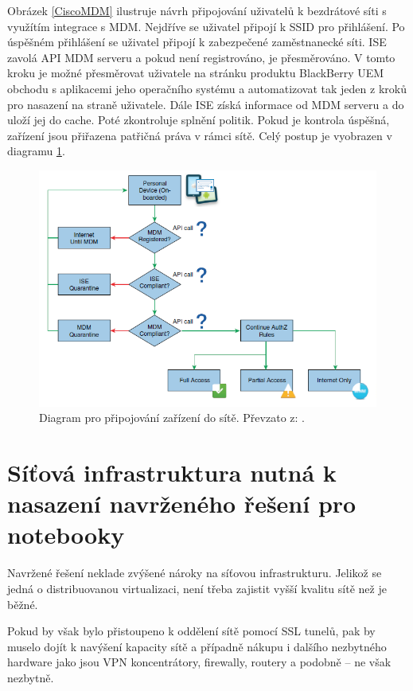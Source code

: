 Obrázek \ref{CiscoMDM} ilustruje návrh připojování uživatelů k bezdrátové síti s využítím integrace s MDM. Nejdříve se uživatel připojí k SSID pro přihlášení. Po úspěšném přihlášení se uživatel připojí k zabezpečené zaměstnanecké síti. ISE zavolá API MDM serveru a pokud není registrováno, je přesměrováno. V tomto kroku je možné přesměrovat uživatele na stránku produktu BlackBerry UEM obchodu s aplikacemi jeho operačního systému a automatizovat tak jeden z kroků pro nasazení na straně uživatele. Dále ISE získá informace od MDM serveru a do uloží jej do cache. Poté zkontroluje splnění politik. Pokud je kontrola úspěšná, zařízení jsou přiřazena patřičná práva v rámci sítě. Celý postup je vyobrazen v diagramu \ref{CiscoFlow}.


\begin{figure}[h!]
\centering
\includegraphics[width=13cm]{img/CiscoFlow}
\caption{Diagram pro připojování zařízení do sítě. Převzato z: \cite{CiscoDesign}.\label{CiscoFlow}}
\end{figure}


\section{Síťová infrastruktura nutná k nasazení navrženého řešení pro notebooky}
Navržené řešení neklade zvýšené nároky na síťovou infrastrukturu. Jelikož se jedná o distribuovanou virtualizaci, není třeba zajistit vyšší kvalitu sítě než je běžné.

Pokud by však bylo přistoupeno k oddělení sítě pomocí SSL tunelů, pak by muselo dojít k navýšení kapacity sítě a případně nákupu i dalšího nezbytného hardware jako jsou VPN koncentrátory, firewally, routery a podobně -- ne však nezbytně.

